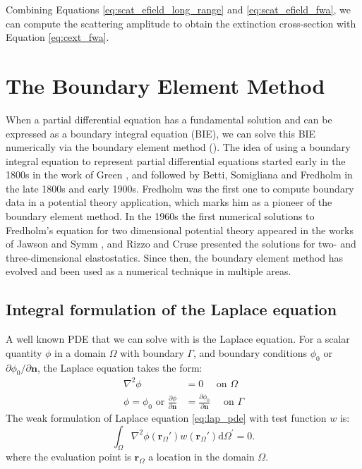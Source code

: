 Combining Equations \eqref{eq:scat_efield_long_range} and \eqref{eq:scat_efield_fwa},
we can compute the scattering amplitude to  obtain the extinction cross-section 
with Equation \eqref{eq:cext_fwa}.

\section{The Boundary Element Method} \label{sec:lspr_bem}

When a partial differential equation has a fundamental solution and can be expressed as a boundary integral equation (BIE), we can 
solve this BIE numerically via the boundary element method (\bem). The idea of using a boundary integral equation to represent partial 
differential equations started early in the 1800s in the work of Green \cite{Green1828}, and followed by Betti, Somigliana and Fredholm \cite{Betti1872,Somigliana1885,Fredholm1903} 
in the late 1800s and early 1900s. Fredholm was the first one to compute boundary data in a potential theory application, which marks him as a 
pioneer of the boundary element method. In the 1960s the first numerical solutions to Fredholm's equation for two dimensional potential theory appeared in 
the works of Jawson \cite{Jawson1963} and Symm \cite{Symm1963}, and Rizzo \cite{Rizzo1967} and Cruse \cite{Cruse1969} presented the solutions for 
two- and three-dimensional elastostatics. Since then, the boundary element method has evolved and been used as a numerical technique in 
multiple areas\cite{Atkinson1997,McLean2000,Steinbach2008, BrebbiaDominguez1992, Katsikadelis2002}.

\subsection{Integral formulation of the Laplace equation} \label{ssec:int_form}

A well known PDE that we can solve with \bem is the Laplace equation. For a scalar quantity $\phi$ in a domain $\Omega$ with boundary $\Gamma$, and 
boundary conditions $\phi_0$ or $\partial \phi_0/\partial \mathbf{n}$, the Laplace equation takes the form:
%
\begin{align} \label{eq:lap_pde}
\nabla^2\phi &= 0 \quad \text{ on $\Omega$} \nonumber \\
\phi = \phi_0 \text{ or } \frac{\partial \phi}{\partial \mathbf{n}} &= \frac{\partial \phi_0}{\partial \mathbf{n}} \quad \text{ on $\Gamma$} 
\end{align}
%
The weak formulation of Laplace equation \eqref{eq:lap_pde} with test function $w$ is:
%
\begin{equation} \label{eq:lap_weak}
\int_\Omega \nabla^2 \phi(\mathbf{r}_\Omega') w(\mathbf{r}_\Omega') \text{d} \Omega^\prime= 0.
\end{equation}
%
where the evaluation point is $\mathbf{r}_\Omega$ a location in the domain $\Omega$.

